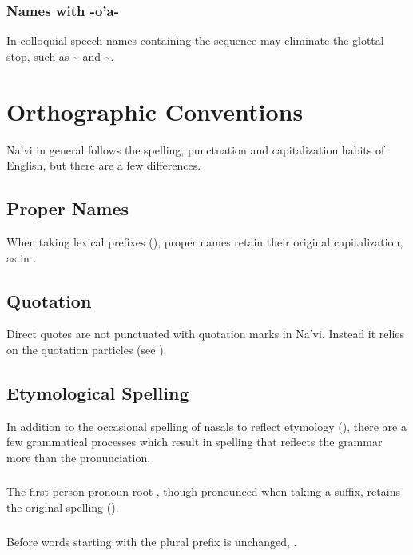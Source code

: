 \subsubsection{Names with -o'a-} \label{names-with-oa}
In colloquial speech names containing the sequence  may
eliminate the glottal stop, such
as  \textasciitilde{}  
and  \textasciitilde {}.


\section{Orthographic Conventions}
\noindent Na'vi in general follows the spelling, punctuation and
capitalization habits of English, but there are a few differences.

\subsection{Proper Names} When taking lexical prefixes
(), proper names retain their original
capitalization, as in .

\subsection{Quotation} Direct quotes are not punctuated with quotation
marks in Na'vi.  Instead it relies on the quotation particles
 (see ).

\subsection{Etymological Spelling} In addition to the occasional
spelling of nasals to reflect etymo\-logy (),
there are a few grammatical processes which result in spelling that
reflects the grammar more than the pronunciation.

\subsubsection{} The first person pronoun root , though
pronounced  when taking a suffix, retains the original spelling
().

\subsubsection{} Before words starting with  the plural prefix
 is unchanged, .

